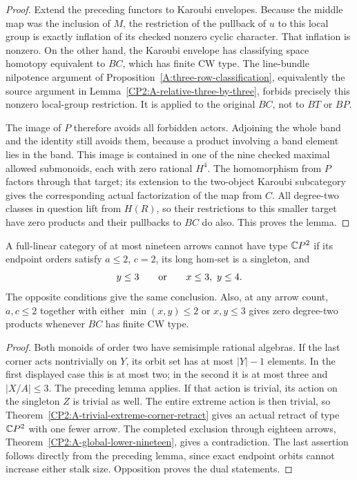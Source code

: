 \begin{proof}
Extend the preceding functors to Karoubi envelopes. Because
the middle map was the inclusion of $M$, the restriction of
the pullback of $u$ to this local group is exactly inflation
of its checked nonzero cyclic character. That inflation is
nonzero. On the other hand, the Karoubi envelope has classifying
space homotopy equivalent to $BC$, which has finite CW type.
The line-bundle nilpotence argument of
Proposition~\ref{A:three-row-classification}, equivalently the
source argument in Lemma~\ref{CP2:A-relative-three-by-three},
forbids precisely this nonzero local-group restriction.
It is applied to the original $BC$, not to $BT$ or $BP$.

The image of $P$ therefore avoids all forbidden actors.
Adjoining the whole band and the identity still avoids them,
because a product involving a band element lies in the band.
This image is contained in one of the nine checked maximal
allowed submonoids, each with zero rational $H^4$.
The homomorphism from $P$ factors through that target; its
extension to the two-object Karoubi subcategory gives the
corresponding actual factorization of the map from $C$.
All degree-two classes in question lift from $H(R)$, so their
restrictions to this smaller target have zero products and
their pullbacks to $BC$ do also. This proves the lemma.
\end{proof}

\begin{corollary}
\label{CP2:A-linear19-two-endpoint-short-stalk}
A full-linear category of at most nineteen arrows cannot have
type $\mathbb{C}P^2$ if its endpoint orders satisfy $a\le2$, $c=2$,
its long hom-set is a singleton, and
\[
 y\le3\qquad\hbox{or}\qquad x\le3,\ y\le4.
\]
The opposite conditions give the same conclusion. Also, at
any arrow count, $a,c\le2$ together with either
$\min(x,y)\le2$ or $x,y\le3$ gives zero degree-two products
whenever $BC$ has finite CW type.
\end{corollary}
\begin{proof}
Both monoids of order two have semisimple rational algebras.
If the last corner acts nontrivially on $Y$, its orbit set has
at most $|Y|-1$ elements. In the first displayed case this is
at most two; in the second it is at most three and
$|X/A|\le3$. The preceding lemma applies. If that action is
trivial, its action on the singleton $Z$ is trivial as well.
The entire extreme action is then trivial, so
Theorem~\ref{CP2:A-trivial-extreme-corner-retract} gives an
actual retract of type $\mathbb{C}P^2$ with one fewer arrow.
The completed exclusion through eighteen arrows,
Theorem~\ref{CP2:A-global-lower-nineteen}, gives a contradiction.
The last assertion follows directly from the preceding lemma,
since exact endpoint orbits cannot increase either stalk size.
Opposition proves the dual statements.
\end{proof}

